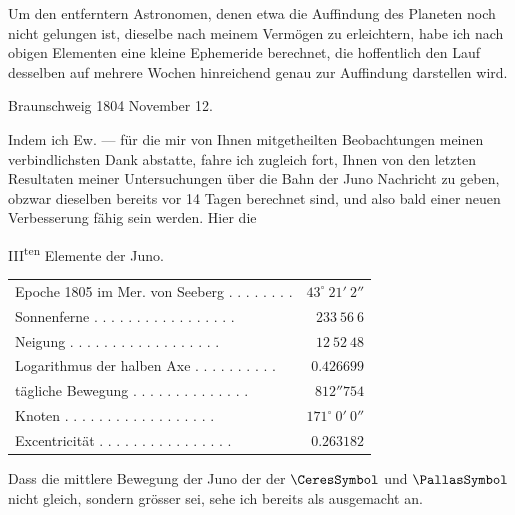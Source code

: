 Um den entferntern Astronomen, denen etwa die Auffindung des Planeten noch nicht gelungen
ist, dieselbe nach meinem Vermögen zu erleichtern, habe ich nach obigen Elementen eine
kleine Ephemeride berechnet, die hoffentlich den Lauf desselben auf mehrere Wochen
hinreichend genau zur Auffindung darstellen wird.

\begin{flushright}
Braunschweig 1804 November 12.
\end{flushright}

\par\indent Indem ich Ew. --- für die mir von Ihnen mitgetheilten Beobachtungen meinen
verbindlichsten Dank abstatte, fahre ich zugleich fort, Ihnen von den letzten
Resultaten meiner Untersuchungen über die Bahn der Juno Nachricht zu geben, obzwar
dieselben bereits vor 14 Tagen berechnet sind, und also bald einer neuen Verbesserung
fähig sein werden. Hier die

\begin{center}
III\textsuperscript{ten} Elemente der Juno.
\end{center}

\begin{center}
\begingroup\fontsize{9}{11}\selectfont\setlength{\tabcolsep}{3pt}
\begin{tabular}{lr}
Epoche 1805 im Mer. von Seeberg . . . . . . . . & $43^\circ\ 21'\ 2''$ \\
Sonnenferne . . . . . . . . . . . . . . . . . & $233\ 56\ 6$ \\
Neigung . . . . . . . . . . . . . . . . . . & $12\ 52\ 48$ \\
Logarithmus der halben Axe . . . . . . . . . . & $0.426699$ \\
tägliche Bewegung . . . . . . . . . . . . . . & $812''754$ \\
Knoten . . . . . . . . . . . . . . . . . . & $171^\circ\ 0'\ 0''$ \\
Excentricität . . . . . . . . . . . . . . . . & $0.263182$ \\
\end{tabular}\endgroup
\end{center}

Dass die mittlere Bewegung der Juno der der $\CeresSymbol$ und $\PallasSymbol$
nicht gleich, sondern grösser sei, sehe ich bereits als ausgemacht an.

